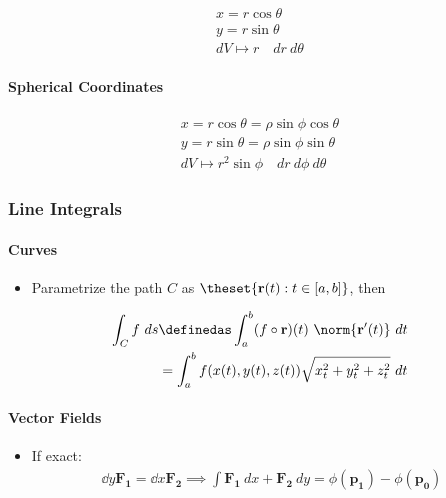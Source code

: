 \begin{align*}
x = r\cos\theta \\
y = r\sin\theta \\
dV \mapsto r \quad dr~d\theta
\end{align*}

\hypertarget{spherical-coordinates}{%
\paragraph{Spherical Coordinates}\label{spherical-coordinates}}

\begin{align*}
x = r\cos\theta = \rho\sin\phi\cos\theta \\
y = r\sin\theta = \rho\sin\phi\sin\theta \\
dV \mapsto r^2 \sin\phi \quad dr~d\phi~d\theta
\end{align*}

\hypertarget{line-integrals}{%
\subsubsection{Line Integrals}\label{line-integrals}}

\hypertarget{curves-1}{%
\paragraph{Curves}\label{curves-1}}

\begin{itemize}
\tightlist
\item
  Parametrize the path \(C\) as \(\theset{\mathbf{r}(t): t\in[a,b]}\),
  then
\end{itemize}

\begin{align*}
\int_C f ~ds
&\definedas \int_a^b (f\circ \mathbf{r})(t) ~\norm{\mathbf{r}'(t)}~dt \\
&= \int_a^b f(x(t), y(t), z(t)) \sqrt{x_t^2 + y_t^2 + z_t^2} ~dt
\end{align*}

\hypertarget{vector-fields}{%
\paragraph{Vector Fields}\label{vector-fields}}

\begin{itemize}
\tightlist
\item
  If exact:
  \begin{align*}
  \dd{}{y} \mathbf{F_1} = \dd{}{x} \mathbf{F_2} \implies
  \int \mathbf{F_1} ~dx + \mathbf{F_2} ~dy = \phi(\mathbf{p_1}) - \phi(\mathbf{p_0})
  \end{align*}
\end{itemize}

